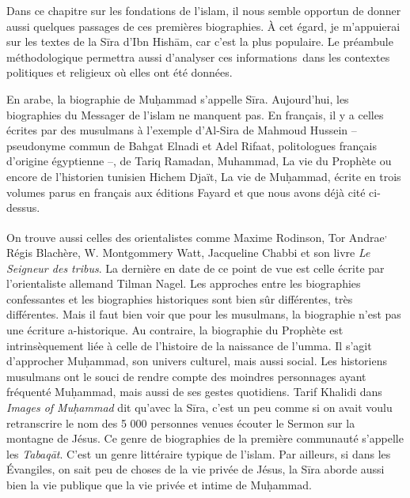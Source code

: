 Dans ce chapitre sur les fondations de l'islam, il nous semble opportun
de donner aussi quelques passages de ces premières biographies. À cet
égard, je m'appuierai sur les textes de la Sīra d'Ibn Hishām, car c'est
la plus populaire. Le préambule méthodologique permettra aussi
d'analyser ces informations~dans les contextes politiques et religieux
où elles ont été données.


En arabe, la biographie de Muḥammad s'appelle Sīra. Aujourd'hui, les
biographies du Messager de l'islam ne manquent pas. En français, il y a
celles écrites par des musulmans à l'exemple d'Al-Sira de Mahmoud
Hussein -- pseudonyme commun de Bahgat Elnadi et Adel Rifaat,
politologues français d'origine égyptienne --, de Tariq Ramadan,
Muhammad, La vie du Prophète ou encore de l'historien tunisien Hichem
Djaït, La vie de Muḥammad, écrite en trois volumes parus en français aux
éditions Fayard et que nous avons déjà cité ci-dessus.

On trouve aussi celles des orientalistes comme Maxime
Rodinson, Tor
Andrae\textsuperscript{,} Régis Blachère, W.
Montgommery Watt, Jacqueline Chabbi et son
livre \emph{Le Seigneur des tribus}. La dernière en date de ce point de
vue est celle écrite par l'orientaliste allemand Tilman Nagel. Les
approches entre les biographies confessantes et les biographies
historiques sont bien sûr différentes, très différentes. Mais il faut
bien voir que pour les musulmans, la biographie n'est pas une écriture
a-historique. Au contraire, la biographie du Prophète est
intrinsèquement liée à celle de l'histoire de la naissance de l'umma. Il
s'agit d'approcher Muḥammad, son univers culturel, mais aussi social.
Les historiens musulmans ont le souci de rendre compte des moindres
personnages ayant fréquenté Muḥammad, mais aussi de ses gestes
quotidiens. Tarif Khalidi dans \emph{Images of Muḥammad} dit qu'avec la
Sīra, c'est un peu comme si on avait voulu retranscrire le nom des 5 000
personnes venues écouter le Sermon sur la montagne de Jésus. Ce genre de
biographies de la première communauté s'appelle les \emph{Tabaqāt}.
C'est un genre littéraire typique de l'islam. Par ailleurs, si dans les
Évangiles, on sait peu de choses de la vie privée de Jésus, la Sīra
aborde aussi bien la vie publique que la vie privée et intime de
Muḥammad.

